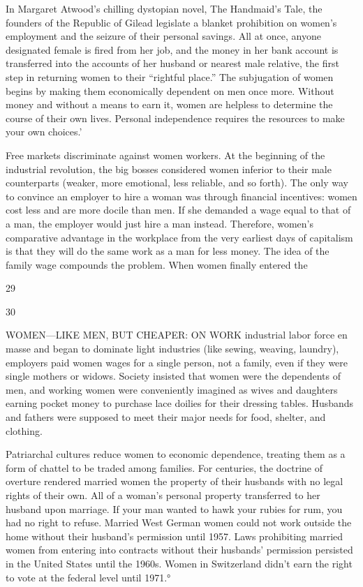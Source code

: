  \par 
In Margaret Atwood’s chilling dystopian novel, The Handmaid's Tale, the founders of the Republic of Gilead legislate a blanket prohibition on women’s employment and the seizure of their personal savings. All at once, anyone designated female is fired from her job, and the money in her bank account is transferred into the accounts of her husband or nearest male relative, the first step in returning women to their “rightful place.” The subjugation of women begins by making them economically dependent on men once more. Without money and without a means to earn it, women are helpless to determine the course of their own lives. Personal independence requires the resources to make your own choices.’
 \par 
Free markets discriminate against women workers. At the beginning of the industrial revolution, the big bosses considered women inferior to their male counterparts (weaker, more emotional, less reliable, and so forth). The only way to convince an employer to hire a woman was through financial incentives: women cost less and are more docile than men. If she demanded a wage equal to that of a man, the employer would just hire a man instead. Therefore, women’s comparative advantage in the workplace from the very earliest days of capitalism is that they will do the same work as a man for less money. The idea of the family wage compounds the problem. When women finally entered the
 \par 
29
 \par 
30
 \par 
WOMEN—LIKE MEN, BUT CHEAPER: ON WORK industrial labor force en masse and began to dominate light industries (like sewing, weaving, laundry), employers paid women wages for a single person, not a family, even if they were single mothers or widows. Society insisted that women were the dependents of men, and working women were conveniently imagined as wives and daughters earning pocket money to purchase lace doilies for their dressing tables. Husbands and fathers were supposed to meet their major needs for food, shelter, and clothing.
 \par 
Patriarchal cultures reduce women to economic dependence, treating them as a form of chattel to be traded among families. For centuries, the doctrine of overture rendered married women the property of their husbands with no legal rights of their own. All of a woman’s personal property transferred to her husband upon marriage. If your man wanted to hawk your rubies for rum, you had no right to refuse. Married West German women could not work outside the home without their husband’s permission until 1957. Laws prohibiting married women from entering into contracts without their husbands’ permission persisted in the United States until the 1960s. Women in Switzerland didn’t earn the right to vote at the federal level until 1971.°
